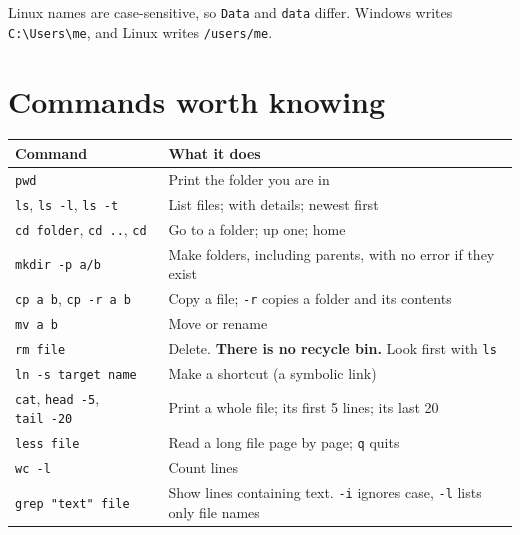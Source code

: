 Linux names are case-sensitive, so \texttt{Data} and \texttt{data} differ. Windows writes \texttt{C:\textbackslash{}Users\textbackslash{}me}, and Linux writes \texttt{/users/me}.

\section{Commands worth knowing}\label{commands-worth-knowing}

{\def\LTcaptype{none} %
\begin{longtable}[]{@{}
  >{\raggedright\arraybackslash}p{}
  >{\raggedright\arraybackslash}p{}@{}}
\toprule\noalign{}
\begin{minipage}[b]{\linewidth}\raggedright
Command
\end{minipage} & \begin{minipage}[b]{\linewidth}\raggedright
What it does
\end{minipage} \\
\midrule\noalign{}
\endhead
\bottomrule\noalign{}
\endlastfoot
\texttt{pwd} & Print the folder you are in \\
\texttt{ls}, \texttt{ls\ -l}, \texttt{ls\ -t} & List files; with details; newest first \\
\texttt{cd\ folder}, \texttt{cd\ ..}, \texttt{cd} & Go to a folder; up one; home \\
\texttt{mkdir\ -p\ a/b} & Make folders, including parents, with no error if they exist \\
\texttt{cp\ a\ b}, \texttt{cp\ -r\ a\ b} & Copy a file; \texttt{-r} copies a folder and its contents \\
\texttt{mv\ a\ b} & Move or rename \\
\texttt{rm\ file} & Delete. \textbf{There is no recycle bin.} Look first with \texttt{ls} \\
\texttt{ln\ -s\ target\ name} & Make a shortcut (a symbolic link) \\
\texttt{cat}, \texttt{head\ -5}, \texttt{tail\ -20} & Print a whole file; its first 5 lines; its last 20 \\
\texttt{less\ file} & Read a long file page by page; \texttt{q} quits \\
\texttt{wc\ -l} & Count lines \\
\texttt{grep\ "text"\ file} & Show lines containing text. \texttt{-i} ignores case, \texttt{-l} lists only file names \\

\end{longtable}}
